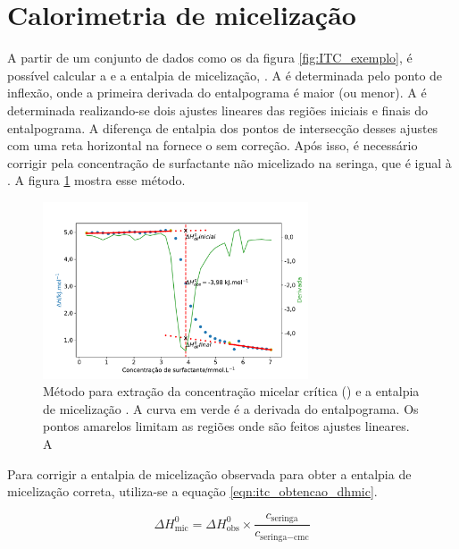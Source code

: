 		\section{Calorimetria de micelização}
		
		A partir de um conjunto de dados como os da figura \ref{fig:ITC_exemplo}, é possível calcular a \cmc{} e a entalpia de micelização, \DHmic. A \cmc{} é determinada pelo ponto de inflexão, onde a primeira derivada do entalpograma é maior (ou menor). A \DHmic{} é determinada realizando-se dois ajustes lineares das regiões iniciais e finais do entalpograma. A diferença de entalpia dos pontos de intersecção desses ajustes com uma reta horizontal na \cmc{} fornece o \DHmic{} sem correção. Após isso, é necessário corrigir pela concentração de surfactante não micelizado na seringa, que é igual à \cmc{}. A figura \ref{fig:itc_extracao_cmc_dh} mostra esse método.
		
		\begin{figure}[h]
			\centering
			\includegraphics[width=0.7\textwidth]{imagens/itc/extracao_cmc_dh_exemplo}
			\caption{Método para extração da concentração micelar crítica (\cmc) e a entalpia de micelização \DHmic. A curva em verde é a derivada do entalpograma. Os pontos amarelos limitam as regiões onde são feitos ajustes lineares. A }
			\label{fig:itc_extracao_cmc_dh}
		\end{figure}  %

		Para corrigir a entalpia de micelização observada para obter a entalpia de micelização correta, utiliza-se a equação \ref{eqn:itc_obtencao_dhmic}. 
		
		\begin{equation}
			\Delta H^0_{\textrm{mic}} = \Delta H^0_{\textrm{obs}} \times \dfrac{c_{\textrm{seringa}}}{c_{\textrm{seringa}-\textrm{cmc}}}
			\label{eqn:itc_obtencao_dhmic}
		\end{equation}  %
		
